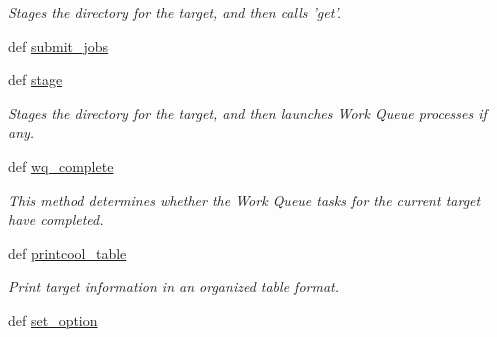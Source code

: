 \begin{DoxyCompactItemize}
\begin{DoxyCompactList}\small\item\em Stages the directory for the target, and then calls 'get'. \end{DoxyCompactList}\item 
def \hyperlink{classforcebalance_1_1target_1_1Target_a78cd29b94cbcc201eed99c78aaef46a4}{submit\-\_\-jobs}
\item 
def \hyperlink{classforcebalance_1_1target_1_1Target_af8d2a4658c87841e40296795aec478bb}{stage}
\begin{DoxyCompactList}\small\item\em Stages the directory for the target, and then launches Work Queue processes if any. \end{DoxyCompactList}\item 
def \hyperlink{classforcebalance_1_1target_1_1Target_af6099ec09486213869dba2491bd8ea04}{wq\-\_\-complete}
\begin{DoxyCompactList}\small\item\em This method determines whether the Work Queue tasks for the current target have completed. \end{DoxyCompactList}\item 
def \hyperlink{classforcebalance_1_1target_1_1Target_ac30a4e9d7d9fe06f7caefa5f7cfab09b}{printcool\-\_\-table}
\begin{DoxyCompactList}\small\item\em Print target information in an organized table format. \end{DoxyCompactList}\item 
def \hyperlink{classforcebalance_1_1baseclass_1_1ForceBalanceBaseClass_abaaf4d99b043d41f02fabc41db59252b}{set\-\_\-option}
\end{DoxyCompactItemize}
